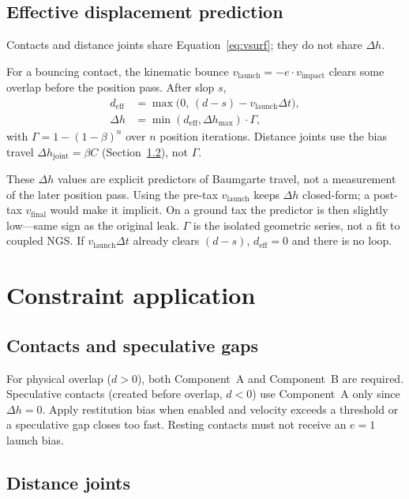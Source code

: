 \documentclass{jcgt}
\begin{document}
\subsection{Effective displacement prediction}
\label{sec:deff}

Contacts and distance joints share Equation~\eqref{eq:vsurf}; they do not share $\Delta h$.

For a bouncing contact, the kinematic bounce $v_{\mathrm{launch}} = -e\cdot v_{\mathrm{impact}}$ clears some overlap before the position pass. After slop $s$,
\begin{align}
d_{\mathrm{eff}} &= \max\bigl(0,\, (d - s) - v_{\mathrm{launch}}\Delta t\bigr),
\label{eq:deff}\\
\Delta h &= \min(d_{\mathrm{eff}}, \Delta h_{\max})\cdot\Gamma,
\label{eq:deltah}
\end{align}
with $\Gamma = 1-(1-\beta)^n$ over $n$ position iterations. Distance joints use the bias travel $\Delta h_{\mathrm{joint}} = \beta C$ (Section~\ref{sec:joints}), not $\Gamma$.

These $\Delta h$ values are explicit predictors of Baumgarte travel, not a measurement of the later position pass. Using the pre-tax $v_{\mathrm{launch}}$ keeps $\Delta h$ closed-form; a post-tax $v_{\mathrm{final}}$ would make it implicit. On a ground tax the predictor is then slightly low---same sign as the original leak. $\Gamma$ is the isolated geometric series, not a fit to coupled NGS. If $v_{\mathrm{launch}}\Delta t$ already clears $(d-s)$, $d_{\mathrm{eff}}=0$ and there is no loop.

\section{Constraint application}
\label{sec:constraints}

\subsection{Contacts and speculative gaps}

For physical overlap ($d > 0$), both Component~A and Component~B are required. Speculative contacts (created before overlap, $d < 0$) use Component~A only since $\Delta h = 0$. Apply restitution bias when enabled and velocity exceeds a threshold or a speculative gap closes too fast. Resting contacts must not receive an $e=1$ launch bias.

\subsection{Distance joints}
\label{sec:joints}
\end{document}
